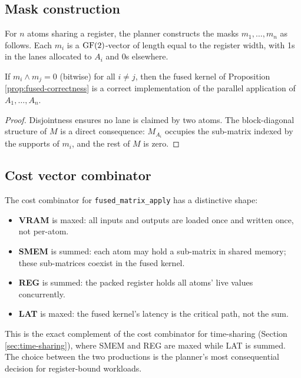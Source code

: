 \subsection{Mask construction}

For $n$ atoms sharing a register, the planner
constructs the masks $m_1, \ldots, m_n$ as follows.
Each $m_i$ is a $\operatorname{GF}(2)$-vector of length equal to the
register width, with 1s in the lanes allocated to
$A_i$ and 0s elsewhere.

\begin{proposition}
  \label{prop:mask-disjoint}
  If $m_i \wedge m_j = 0$ (bitwise) for all $i \neq j$,
  then the fused kernel of Proposition
  \ref{prop:fused-correctness} is a correct
  implementation of the parallel application of
  $A_1, \ldots, A_n$.
\end{proposition}

\begin{proof}
  Disjointness ensures no lane is claimed by two
  atoms. The block-diagonal structure of $M$ is a
  direct consequence: $M_{A_i}$ occupies the sub-matrix
  indexed by the supports of $m_i$, and the rest of
  $M$ is zero.
\end{proof}

\subsection{Cost vector combinator}

The cost combinator for \texttt{fused\_matrix\_apply}
has a distinctive shape:

\begin{itemize}[nosep]
  \item \textbf{VRAM} is maxed: all inputs and outputs
    are loaded once and written once, not per-atom.
  \item \textbf{SMEM} is summed: each atom may hold a
    sub-matrix in shared memory; these sub-matrices
    coexist in the fused kernel.
  \item \textbf{REG} is summed: the packed register
    holds all atoms' live values concurrently.
  \item \textbf{LAT} is maxed: the fused kernel's
    latency is the critical path, not the sum.
\end{itemize}

This is the exact complement of the cost combinator for
time-sharing (Section \ref{sec:time-sharing}), where
SMEM and REG are maxed while LAT is summed. The choice
between the two productions is the planner's most
consequential decision for register-bound workloads.

